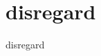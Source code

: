 \chapter{disregard}
\label{disregard}

disregard \cite{inbook, inproceedings, article7, Wan01theunscented, article6, inbool, article5}